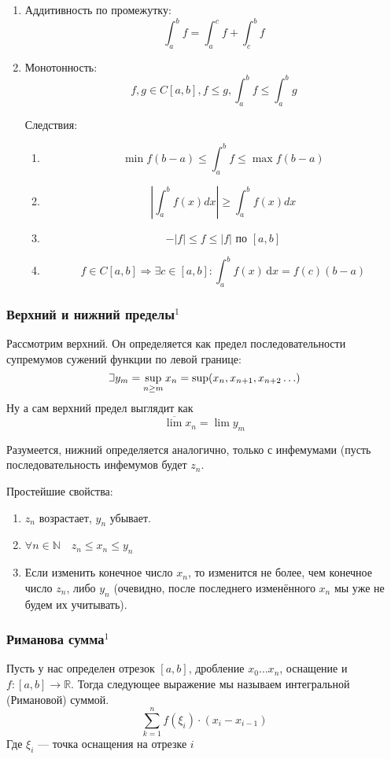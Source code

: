 \documentclass{article}
\def\letus{%
\mathord{\setbox0=\hbox{$\exists$}%
         \hbox{\kern 0.125\wd0%
               \vbox to \ht0{%
                  \hrule width 0.75\wd0%
                  \vfill%
                  \hrule width 0.75\wd0}%
               \vrule height \ht0%
               \kern 0.125\wd0}%
       }%
        }
\def\D{\,\mathrm{d}}
\begin{document}
\begin{enumerate}
    \item Аддитивность по промежутку: 
    \[\int_a^bf = \int_a^cf + \int_c^bf\]
    \item Монотонность:
    \[f, g \in C[a, b], f \le g, \int_a^b f \le \int_a^bg\]
    
    Следствия:
    \begin{enumerate}
   \item \[\min{f}(b - a) \le \int_a^bf \le \max{f}(b - a)\]
    \item \[\left|\int_a^bf(x)dx\right| \ge \int_a^bf(x)dx\]
     \item \[-|f| \le f \le |f|\text{ по }[a, b]\]
     \item \[f \in C[a, b] \Rightarrow \exists c \in [a, b]: \int_a^bf(x)\D x = f(c)(b - a)\]
    \end{enumerate}
\end{enumerate}

\subsubsection{Верхний и нижний пределы\texorpdfstring{$^1$}{}}\label{ВНП}
Рассмотрим верхний. Он определяется как предел последовательности супремумов сужений функции по левой границе:
$$
\letus y_m = \sup_{n \ge m}x_n = \sup(x_n, x_{n+1}, x_{n+2} \ldots)
$$
Ну а сам верхний предел выглядит как
$$
\overline{\lim}x_n = \lim y_m
$$

Разумеется, нижний определяется аналогично, только с инфемумами (пусть последовательность инфемумов будет $z_n$.

Простейшие свойства:
\begin{enumerate}
    \item $z_n$ возрастает, $y_n$ убывает.
    \item $\forall n \in \mathbb{N} \quad z_n \le x_n \le y_n$
    \item Если изменить конечное число $x_n$, то изменится не более, чем конечное число $z_n$, либо $y_n$ (очевидно, после последнего изменённого $x_n$ мы уже не будем их учитывать). 
\end{enumerate}


\subsubsection{Риманова сумма\texorpdfstring{$^1$}{}}
Пусть у нас определен отрезок $[a, b]$, дробление $x_0\ldots x_n$, оснащение и $f: [a, b] \rightarrow \mathbb{R}$. Тогда следующее выражение мы называем интегральной (Римановой) суммой.
$$
\sum_{k=1}^n f(\xi_i)\cdot(x_i-x_{i-1})
$$
Где $\xi_i$ --- точка оснащения на отрезке $i$
\end{document}
